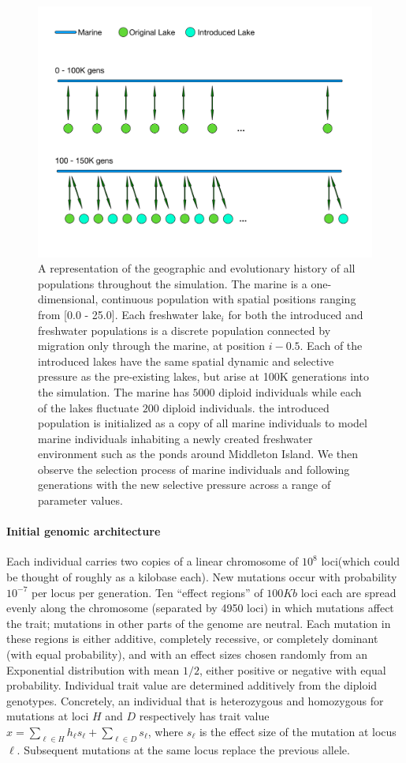 \documentclass{article}
\begin{document}
\begin{figure}
	\begin{center}
  		\includegraphics[width=0.6\linewidth]{GeographyFigure.pdf}
  		\caption{
			A representation of the geographic and evolutionary history of all populations throughout the simulation. 
		The marine is a one-dimensional, continuous population with spatial positions ranging from [0.0 - 25.0]. 
		Each freshwater lake$_{i}$ for both the introduced and freshwater populations
		is a discrete population connected by migration only through the marine, at position $i - 0.5$. 
		Each of the introduced lakes have the same spatial dynamic and selective pressure 
        as the pre-existing lakes, but arise at 100K generations into the simulation.
		The marine has $5000$ diploid individuals while each of the lakes fluctuate  $200$ diploid individuals. 
		the introduced population is initialized as a copy of all marine individuals to model marine 
		individuals inhabiting a newly created freshwater environment such as the ponds around Middleton Island.
		We then observe the selection process of marine individuals and following generations 
		with the new selective pressure across a range of parameter values. 
			}
  		\label{fig:Geo}
	\end{center}
\end{figure}

\paragraph{Initial genomic architecture} Each individual carries two copies of a linear chromosome of $10^8$ loci(which could be thought of roughly as a kilobase each). 
New mutations occur with probability $10^{-7}$ per locus per generation. 
Ten ``effect regions'' of $100Kb$ loci each are spread evenly along the chromosome (separated by 4950 loci) in which mutations affect the trait; 
mutations in other parts of the genome are neutral. 
Each mutation in these regions is either additive, completely recessive, or completely dominant (with equal probability), 
and with an effect sizes chosen randomly from an Exponential distribution with mean $1/2$, either positive or negative with equal probability. 
Individual trait value are determined additively from the diploid genotypes. 
Concretely, an individual that is heterozygous and homozygous for mutations at loci $H$ and $D$ respectively has trait value 
$x = \sum_{\ell \in H} h_\ell s_\ell + \sum_{\ell \in D} s_\ell$, 
where $s_\ell$ is the effect size of the mutation at locus $\ell$. Subsequent mutations at the same locus replace the previous allele.
\end{document}

